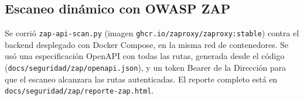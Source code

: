 \subsection{Escaneo dinámico con OWASP ZAP}\label{sec:zap}
Se corrió \texttt{zap-api-scan.\allowbreak{}py} (imagen \texttt{ghcr.\allowbreak{}io/\allowbreak{}zaproxy/\allowbreak{}zaproxy:stable}) contra el backend desplegado con Docker Compose, en la misma red de contenedores. Se usó una especificación OpenAPI con todas las rutas, generada desde el código (\texttt{docs/\allowbreak{}seguridad/\allowbreak{}zap/\allowbreak{}openapi.\allowbreak{}json}), y un token Bearer de la Dirección para que el escaneo alcanzara las rutas autenticadas. El reporte completo está en \texttt{docs/\allowbreak{}seguridad/\allowbreak{}zap/\allowbreak{}reporte-zap.\allowbreak{}html}.


